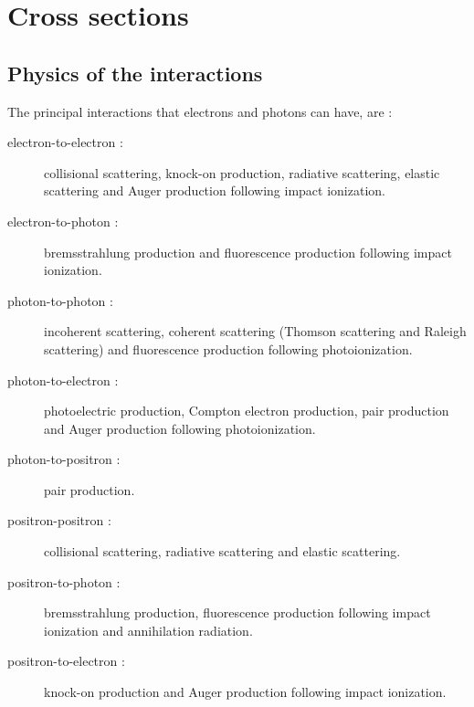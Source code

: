 \section{Cross sections}
\subsection{Physics of the interactions}
The principal interactions that electrons and photons can have, are
\cite{cepxs} :
\begin{description}
\item [electron-to-electron :] collisional scattering, knock-on production,
radiative scattering, elastic scattering and Auger production following impact
ionization.
\item [electron-to-photon :] bremsstrahlung production and fluorescence
production following impact ionization.
\item [photon-to-photon :] incoherent scattering, coherent scattering (Thomson 
scattering and Raleigh scattering) and fluorescence production following
photoionization.
\item [photon-to-electron :] photoelectric production, Compton electron
production, pair production and Auger production following photoionization.
\item [photon-to-positron :] pair production.
\item [positron-positron :] collisional scattering, radiative scattering and
elastic scattering.
\item [positron-to-photon :] bremsstrahlung production, fluorescence
production following impact ionization and annihilation radiation.
\item [positron-to-electron :] knock-on production and Auger production
following impact ionization.
\end{description}

